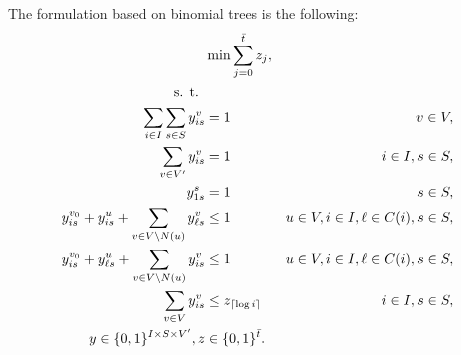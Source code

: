 The formulation based on binomial trees is the following:
\begin{subequations}\label{mod:partition}
\begin{align}
\notag &\min\sum\limits_{j=0}^{\bar{t}}z_j,\\
\notag \text{s. t. } \\
\label{mod:part:nodeBelongs} \sum\limits_{i\in I}\sum\limits_{s\in S}y^v_{is} & = 1 & v\in V,\\
\label{mod:part:treeHasIJ} \sum\limits_{v\in V'}y^v_{is} & = 1 & i\in I,s\in S,\\
\label{mod:part:source1} y_{1s}^s & = 1  & s\in S,\\
\label{mod:part:followArcsA}y^{v_0}_{is}+y^u_{i s} + \sum\limits_{v\in V\setminus N(u)}y^v_{\ell s}&\leq 1 & u\in V,i\in I,\ell\in C(i), s\in S,  \\
\label{mod:part:followArcsB}y^{v_0}_{is}+y^u_{\ell s} + \sum\limits_{v\in V\setminus N(u)}y^v_{i s}&\leq 1 & u\in V,i\in I,\ell\in C(i), s\in S,\\
\label{mod:part:yzrel}\sum\limits_{v\in V}y^v_{is} & \leq z_{\lceil\log i\rceil} & i\in I,s\in S,\\
\label{mod:part:dim}y \in \{0,1\}^{I\times S\times V'}, z&\in \{0,1\}^{\bar{t}}.
\end{align}~
\end{subequations}

